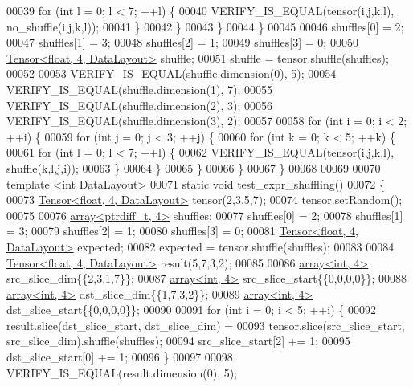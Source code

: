 \begin{DoxyCode}
00039         \textcolor{keywordflow}{for} (\textcolor{keywordtype}{int} l = 0; l < 7; ++l) \{
00040           VERIFY\_IS\_EQUAL(tensor(i,j,k,l), no\_shuffle(i,j,k,l));
00041         \}
00042       \}
00043     \}
00044   \}
00045 
00046   shuffles[0] = 2;
00047   shuffles[1] = 3;
00048   shuffles[2] = 1;
00049   shuffles[3] = 0;
00050   \hyperlink{class_eigen_1_1_tensor}{Tensor<float, 4, DataLayout>} shuffle;
00051   shuffle = tensor.shuffle(shuffles);
00052 
00053   VERIFY\_IS\_EQUAL(shuffle.dimension(0), 5);
00054   VERIFY\_IS\_EQUAL(shuffle.dimension(1), 7);
00055   VERIFY\_IS\_EQUAL(shuffle.dimension(2), 3);
00056   VERIFY\_IS\_EQUAL(shuffle.dimension(3), 2);
00057 
00058   \textcolor{keywordflow}{for} (\textcolor{keywordtype}{int} i = 0; i < 2; ++i) \{
00059     \textcolor{keywordflow}{for} (\textcolor{keywordtype}{int} j = 0; j < 3; ++j) \{
00060       \textcolor{keywordflow}{for} (\textcolor{keywordtype}{int} k = 0; k < 5; ++k) \{
00061         \textcolor{keywordflow}{for} (\textcolor{keywordtype}{int} l = 0; l < 7; ++l) \{
00062           VERIFY\_IS\_EQUAL(tensor(i,j,k,l), shuffle(k,l,j,i));
00063         \}
00064       \}
00065     \}
00066   \}
00067 \}
00068 
00069 
00070 \textcolor{keyword}{template} <\textcolor{keywordtype}{int} DataLayout>
00071 \textcolor{keyword}{static} \textcolor{keywordtype}{void} test\_expr\_shuffling()
00072 \{
00073   \hyperlink{class_eigen_1_1_tensor}{Tensor<float, 4, DataLayout>} tensor(2,3,5,7);
00074   tensor.setRandom();
00075 
00076   \hyperlink{class_eigen_1_1array}{array<ptrdiff\_t, 4>} shuffles;
00077   shuffles[0] = 2;
00078   shuffles[1] = 3;
00079   shuffles[2] = 1;
00080   shuffles[3] = 0;
00081   \hyperlink{class_eigen_1_1_tensor}{Tensor<float, 4, DataLayout>} expected;
00082   expected = tensor.shuffle(shuffles);
00083 
00084   \hyperlink{class_eigen_1_1_tensor}{Tensor<float, 4, DataLayout>} result(5,7,3,2);
00085 
00086   \hyperlink{class_eigen_1_1array}{array<int, 4>} src\_slice\_dim\{\{2,3,1,7\}\};
00087   \hyperlink{class_eigen_1_1array}{array<int, 4>} src\_slice\_start\{\{0,0,0,0\}\};
00088   \hyperlink{class_eigen_1_1array}{array<int, 4>} dst\_slice\_dim\{\{1,7,3,2\}\};
00089   \hyperlink{class_eigen_1_1array}{array<int, 4>} dst\_slice\_start\{\{0,0,0,0\}\};
00090 
00091   \textcolor{keywordflow}{for} (\textcolor{keywordtype}{int} i = 0; i < 5; ++i) \{
00092     result.slice(dst\_slice\_start, dst\_slice\_dim) =
00093         tensor.slice(src\_slice\_start, src\_slice\_dim).shuffle(shuffles);
00094     src\_slice\_start[2] += 1;
00095     dst\_slice\_start[0] += 1;
00096   \}
00097 
00098   VERIFY\_IS\_EQUAL(result.dimension(0), 5);

\end{DoxyCode}
